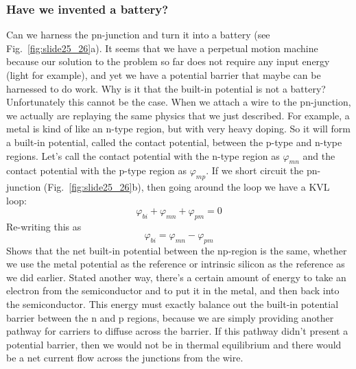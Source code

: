 \subsubsection{Have we invented a battery?}
Can we harness the pn-junction and turn it into a battery (see Fig.~\ref{fig:slide25_26}a).  It seems that we have a perpetual motion machine because our solution to the problem so far does not require any input energy (light for example), and yet we have a potential barrier that maybe can be harnessed to do work.  Why is it that the built-in potential is not a battery?
Unfortunately this cannot be the case.  When we attach a wire to the pn-junction, we actually are replaying the same physics that we just described.  For example, a metal is kind of like an n-type region, but with very heavy doping.  So it will form a built-in potential, called the contact potential, between the p-type and n-type regions.  Let's call the contact potential with the n-type region as $\varphi_{mn}$ and the contact potential with the p-type region as $\varphi_{mp}$.  
If we short circuit the pn-junction (Fig.~\ref{fig:slide25_26}b), then going around the loop we have a KVL loop:
    \begin{equation}
        \varphi_{bi} + \varphi_{mn} + \varphi_{pm} = 0
    \end{equation}
Re-writing this as 
    \begin{equation}
        \varphi_{bi} =  \varphi_{mn} - \varphi_{pm} 
    \end{equation}
Shows that the net built-in potential between the np-region is the same, whether we use the metal potential as the reference or intrinsic silicon as the reference as we did earlier.  
Stated another way, there's a certain amount of energy to take an electron from the semiconductor and to put it in the metal, and then back into the semiconductor.  This energy must exactly balance out the built-in potential barrier between the n and p regions, because we are simply providing another pathway for carriers to diffuse across the barrier.  If this pathway didn't present a potential barrier,  then we would not be in thermal equilibrium and there would be a net current flow across the junctions from the wire.
